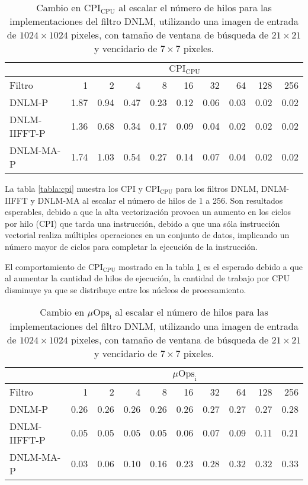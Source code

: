 \begin{table}
\centering
\caption[Cambio en $\text{CPI}_{\text{CPU}}$ al escalar el n\'umero de hilos]{Cambio en $\text{CPI}_{\text{CPU}}$ al escalar el n\'umero de hilos para las implementaciones del filtro DNLM, utilizando una imagen de entrada de $1024 \times 1024$ pixeles, con tama\~no de ventana de búsqueda de $21 \times 21$ y vencidario de $7 \times 7$ pixeles. \label{tabla:cpic}}
\begin{tabular}{lrrrrrrrrr}
& \multicolumn{9}{c}{$\text{CPI}_{\text{CPU}}$} \tabularnewline
\hline
 Filtro & 1 & 2 & 4 & 8 & 16 & 32 & 64 & 128 & 256 \tabularnewline
\hline
DNLM-P & 1.87 & 0.94 & 0.47 & 0.23 & 0.12 & 0.06 & 0.03 & 0.02 & 0.02 \tabularnewline
DNLM-IIFFT-P & 1.36 & 0.68 & 0.34 & 0.17 & 0.09 & 0.04 & 0.02 & 0.02 & 0.02 \tabularnewline
DNLM-MA-P & 1.74 & 1.03 & 0.54 & 0.27 & 0.14 & 0.07 & 0.04 & 0.02 & 0.02 \tabularnewline
\end{tabular}
\end{table}
  
  
La tabla \ref{tabla:cpi} muestra los CPI y $\text{CPI}_{\text{CPU}}$ para los filtros DNLM, DNLM-IIFFT y DNLM-MA al escalar el n\'umero de hilos de 1 a 256. Son resultados esperables, debido a que la alta vectorizaci\'on provoca un aumento en los ciclos por hilo (CPI) que tarda una instrucci\'on, debido a que una s\'ola instrucci\'on vectorial realiza m\'ultiples operaciones en un conjunto de datos, implicando un n\'umero mayor de ciclos para completar la ejecuci\'on de la instrucci\'on. 

El comportamiento de $\text{CPI}_{\text{CPU}}$ mostrado en la tabla \ref{tabla:cpic}  es el esperado debido a  que al aumentar la cantidad de hilos de ejecuci\'on, la cantidad de trabajo por CPU disminuye ya que se distribuye entre los n\'ucleos de procesamiento. 
  

  
\begin{table}
\centering
\caption[Cambio en intensidad de  micro-operaciones al escalar el n\'umero de hilos]{Cambio en  $\mu\text{Ops}_{\text{i}}$ al escalar el n\'umero de hilos para las implementaciones del filtro DNLM, utilizando una imagen de entrada de $1024 \times 1024$ pixeles, con tama\~no de ventana de búsqueda de $21 \times 21$ y vencidario de $7 \times 7$ pixeles. \label{tabla:ucode}}
\begin{tabular}{lrrrrrrrrr}
& \multicolumn{9}{c}{$\mu\text{Ops}_{\text{i}}$} \tabularnewline
\hline
 Filtro & 1 & 2 & 4 & 8 & 16 & 32 & 64 & 128 & 256 \tabularnewline
\hline
DNLM-P & 0.26 & 0.26 & 0.26 & 0.26 & 0.26 & 0.27 & 0.27 & 0.27 & 0.28 \tabularnewline
DNLM-IIFFT-P & 0.05 & 0.05 & 0.05 & 0.05 & 0.06 & 0.07 & 0.09 & 0.11 & 0.21 \tabularnewline
DNLM-MA-P & 0.03 & 0.06 & 0.10 & 0.16 & 0.23 & 0.28 & 0.32 & 0.32 & 0.33 \tabularnewline
\end{tabular}
\end{table}

